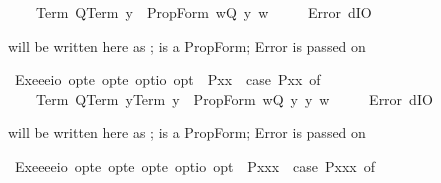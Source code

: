 \begin{isabellebody}
\ \ \ \ {\isacharparenleft}Term\ Q{\isacharcomma}Term\ y{\isacharparenright}\ {\isasymRightarrow}\ PropForm\ {\isacharparenleft}{\isasymlambda}w{\isachardot}{\isacharparenleft}Q\ y{\isacharparenright}\ w{\isacharparenright}\isanewline
\ \ {\isacharbar}\ {\isacharunderscore}\ {\isasymRightarrow}\ Error\ dIO{\isachardoublequoteclose}%
\begin{isamarkuptext}%
  will be written here as ;  is a PropForm; Error is passed on%
\end{isamarkuptext}%
\isamarkuptrue%
\isamarkupfalse%
\ Exe{}{\isacharcolon}{\isacharcolon}{\isachardoublequoteopen}{\isacharparenleft}e{\isasymRightarrow}e{\isasymRightarrow}io{\isacharparenright}\ opt{\isasymRightarrow}e\ opt{\isasymRightarrow}e\ opt{\isasymRightarrow}io\ opt{\isachardoublequoteclose}\ \ {\isachardoublequoteopen}{\isacharless}P{\isasymbullet}x{}{\isacharcomma}x{}{\isachargreater}\ {\isasymequiv}\ case\ {\isacharparenleft}P{\isacharcomma}x{}{\isacharcomma}x{}{\isacharparenright}\ of\ \isanewline
\ \ \ \ {\isacharparenleft}Term\ Q{\isacharcomma}Term\ y{}{\isacharcomma}Term\ y{}{\isacharparenright}\ {\isasymRightarrow}\ PropForm\ {\isacharparenleft}{\isasymlambda}w{\isachardot}{\isacharparenleft}Q\ y{}\ y{}{\isacharparenright}\ w{\isacharparenright}\isanewline
\ \ {\isacharbar}\ {\isacharunderscore}\ {\isasymRightarrow}\ Error\ dIO{\isachardoublequoteclose}%
\begin{isamarkuptext}%
   will be written here as ;  is a PropForm; Error is passed on%
\end{isamarkuptext}%
\isamarkuptrue%
\isamarkupfalse%
\ Exe{}{\isacharcolon}{\isacharcolon}{\isachardoublequoteopen}{\isacharparenleft}e{\isasymRightarrow}e{\isasymRightarrow}e{\isasymRightarrow}io{\isacharparenright}\ opt{\isasymRightarrow}e\ opt{\isasymRightarrow}e\ opt{\isasymRightarrow}e\ opt{\isasymRightarrow}io\ opt{\isachardoublequoteclose}\ \ {\isachardoublequoteopen}{\isacharless}P{\isasymbullet}x{}{\isacharcomma}x{}{\isacharcomma}x{}{\isachargreater}\ {\isasymequiv}\ case\ {\isacharparenleft}P{\isacharcomma}x{}{\isacharcomma}x{}{\isacharcomma}x{}{\isacharparenright}\ of\ \isanewline

\end{isabellebody}
